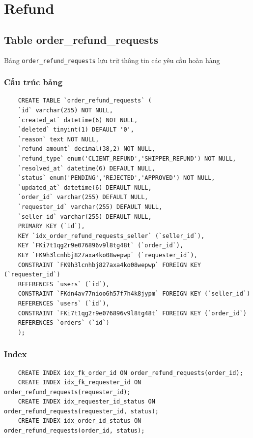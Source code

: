 \section{Refund}

 \subsection{Table order\_refund\_requests}

 Bảng \texttt{order\_refund\_requests} lưu trữ thông tin các yêu cầu hoàn hàng

 \subsubsection{Cấu trúc bảng}

 \begin{verbatim}
    CREATE TABLE `order_refund_requests` (
    `id` varchar(255) NOT NULL,
    `created_at` datetime(6) NOT NULL,
    `deleted` tinyint(1) DEFAULT '0',
    `reason` text NOT NULL,
    `refund_amount` decimal(38,2) NOT NULL,
    `refund_type` enum('CLIENT_REFUND','SHIPPER_REFUND') NOT NULL,
    `resolved_at` datetime(6) DEFAULT NULL,
    `status` enum('PENDING','REJECTED','APPROVED') NOT NULL,
    `updated_at` datetime(6) DEFAULT NULL,
    `order_id` varchar(255) DEFAULT NULL,
    `requester_id` varchar(255) DEFAULT NULL,
    `seller_id` varchar(255) DEFAULT NULL,
    PRIMARY KEY (`id`),
    KEY `idx_order_refund_requests_seller` (`seller_id`),
    KEY `FKi7t1qg2r9e076896v9l8tg48t` (`order_id`),
    KEY `FK9h3lcnhbj827axa4ko08wepwp` (`requester_id`),
    CONSTRAINT `FK9h3lcnhbj827axa4ko08wepwp` FOREIGN KEY (`requester_id`) 
    REFERENCES `users` (`id`),
    CONSTRAINT `FKdn4av77nioo6h57f7h4k8jypm` FOREIGN KEY (`seller_id`) 
    REFERENCES `users` (`id`),
    CONSTRAINT `FKi7t1qg2r9e076896v9l8tg48t` FOREIGN KEY (`order_id`) 
    REFERENCES `orders` (`id`)
    );
 \end{verbatim}

 \subsubsection{Index}

\begin{verbatim}
    CREATE INDEX idx_fk_order_id ON order_refund_requests(order_id);
    CREATE INDEX idx_fk_requester_id ON order_refund_requests(requester_id);
    CREATE INDEX idx_requester_id_status ON order_refund_requests(requester_id, status);
    CREATE INDEX idx_order_id_status ON order_refund_requests(order_id, status);
\end{verbatim}

